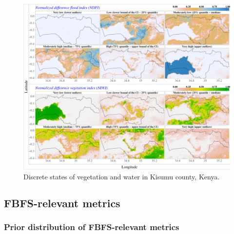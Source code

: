 \documentclass[]{elsarticle} %
\begin{document}
\begin{figure}[!h]

{\centering \includegraphics[width=1\linewidth,]{figures/veg_water_states_plot} 

}

\caption{Discrete states of vegetation and water in Kisumu county, Kenya.}\label{fig:fig5}
\end{figure}

\hypertarget{section_3_2}{%
\subsection{FBFS-relevant metrics}\label{section_3_2}}

\hypertarget{section_3_2_1}{%
\subsubsection{Prior distribution of FBFS-relevant metrics}\label{section_3_2_1}}
\end{document}
